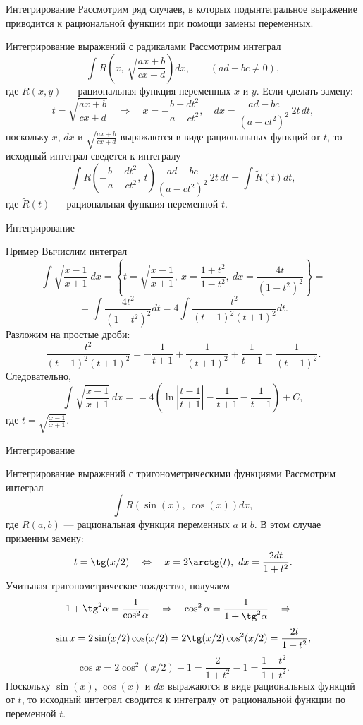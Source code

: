 \documentclass[8pt]{beamer}
\begin{document}
\begin{frame}{Интегрирование}
Рассмотрим ряд случаев, в которых подынтегральное выражение приводится к рациональной функции при помощи замены переменных.

\begin{block}{Интегрирование выражений с радикалами}
Рассмотрим интеграл
$$\int R\left( x,\ \sqrt{\frac{a x+b}{c x+d}}\right) dx,\qquad (ad-bc\ne 0),$$
где $R(x,y)$ --- рациональная функция переменных $x$ и $y$. Если сделать замену:
$$t = \sqrt{\frac{a x+b}{c x+d}} \quad \Rightarrow \quad x= - \frac{b-d t^2}{a-c t^2},\quad dx = \frac{a d-b c}{(a-c t^2)^2}\,2t\,dt,$$
поскольку $x$, $dx$ и $\displaystyle\sqrt{\frac{a x+b}{c x+d}}$ выражаются в виде рациональных функций от $t$, то исходный интеграл сведется к интегралу
$$\int R\left(  - \frac{b-d t^2}{a-c t^2},\ t\right)  \frac{a d-b c}{(a-c t^2)^2}\,2t\,dt = \int \tilde R(t) dt,$$
где $\tilde R(t)$ --- рациональная функция переменной $t$.
\end{block}
\end{frame}

\begin{frame}{Интегрирование}
\begin{block}{Пример}
Вычислим интеграл
$$\int \sqrt{\frac{ x-1}{ x+1}}\ dx = 
\left\{ t= \sqrt{\frac{ x-1}{ x+1}},\ x= \frac{1+t^2}{1-t^2},\ dx=\frac{4t}{(1-t^2)^2}\right\} =$$
$$= \int \frac{4t^2}{(1-t^2)^2}dt =4 \int \frac{t^2}{(t-1)^2(t+1)^2}dt. $$
Разложим на простые дроби:
$$\frac{t^2}{(t-1)^2(t+1)^2} = -\frac{1}{t+1}+\frac{1}{(t+1)^2}+\frac{1}{t-1}+\frac{1}{(t-1)^2}.$$
Следовательно,
$$\int \sqrt{\frac{ x-1}{ x+1}}\ dx = = 4\left( \ln\left| \frac{t-1}{t+1}\right| - \frac{1}{t+1} - \frac{1}{t-1} \right)+C,$$
где $t=\displaystyle \sqrt{\frac{ x-1}{ x+1}}$.
\end{block}
\end{frame}

\begin{frame}{Интегрирование}
\begin{block}{Интегрирование выражений с тригонометрическими функциями}
Рассмотрим интеграл
$$\int R\left( \sin(x),\ \cos(x)\right) dx,$$
где $R(a,b)$ --- рациональная функция переменных $a$ и $b$. В этом случае применим замену:
$$t =\tg(x/2) \quad \Leftrightarrow \quad x =2 \arctg(t),\  dx=\frac{2 dt}{1+t^2}.$$
Учитывая тригонометрическое тождество, получаем
$$1+\tg^2\alpha = \frac{1}{\cos^2\alpha} \quad \Rightarrow\quad \cos^2\alpha=\frac{1}{1+\tg^2\alpha} \quad\Rightarrow \quad$$
$$\sin x = 2\sin(x/2)\cos(x/2) = 2\tg(x/2)\cos^2(x/2) = \frac{2t}{1+t^2},$$
$$\cos x = 2\cos^2(x/2)-1 = \frac{2}{1+t^2}-1 = \frac{1-t^2}{1+t^2}.$$
Поскольку $\sin(x)$, $\cos(x)$ и $dx$ выражаются в виде рациональных функций от $t$, то исходный интеграл сводится к интегралу от рациональной функции по переменной $t$.
\end{block}
\end{frame}
\end{document}
